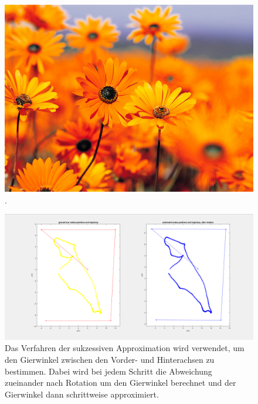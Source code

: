 	\begin{figure}[h]
		\centering
		\includegraphics[width=1\textwidth]{images/Messergebnisse/calibration-sar-error}
		\caption[Abweichung der Voder- und Rückvektoren]{.}
		\label{img:kalibrierung-sar-error}
	\end{figure}

	\begin{figure}[h]
		\centering
		\includegraphics[width=1\textwidth]{images/kalibrierung_sar}
		\caption[Sukzessive Approximation]{Das Verfahren der sukzessiven Approximation wird verwendet, um den Gierwinkel zwischen den Vorder- und Hinterachsen zu bestimmen. Dabei wird bei jedem Schritt die Abweichung zueinander nach Rotation um den Gierwinkel berechnet und der Gierwinkel dann schrittweise approximiert.}
		\label{img:sar}
	\end{figure}



